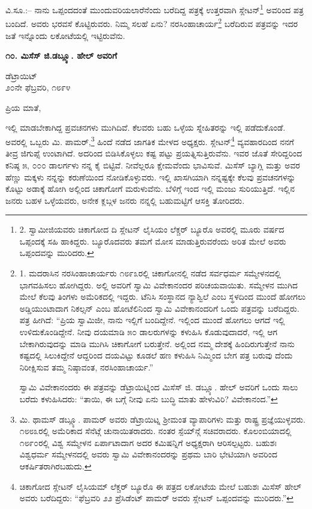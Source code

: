 ವಿ.ಸೂ.:– ನಾನು ಒಪ್ಪಂದದಂತೆ ಮುಂದುವರಿಯಲಾರೆನೆಂದು ಬರೆದಿದ್ದ ಪತ್ರಕ್ಕೆ ಉತ್ತರವಾಗಿ ಸ್ಲೇಟನ್\footnote{2. ಸ್ವಾಮೀಜಿಯವರು ಚಿಕಾಗೋದ ದಿ ಸ್ಲೇಟನ್ ಲೈಸಿಯಂ ಲೆಕ್ಚರ್ ಬ್ಯೂರೊ ಅವರಲ್ಲಿ ಮೂರು ವರ್ಷದ ಒಪ್ಪಂದಕ್ಕೆ ಸಹಿ ಹಾಕಿದ್ದರು. ಬ್ಯೂರೊದವರು ತಮಗೆ ಮೋಸ ಮಾಡುತ್ತಿರುವರೆಂದು ಅರಿತ ಮೇಲೆ ಅವರು ಒಪ್ಪಂದವನ್ನು ಮುರಿದರು.} ಅವರಿಂದ ಪತ್ರ ಬಂದಿದೆ. ಅವರು ಭರವಸೆ ಕೊಟ್ಟಿರುವರು. ನಿಮ್ಮ ಸಲಹೆ ಏನು? ನರಸಿಂಹಾಚಾರ್ಯ\footnote{1. ಮದರಾಸಿನ ನರಸಿಂಹಾಚಾರ್ಯರು ೧೮೯೩ರಲ್ಲಿ ಚಿಕಾಗೋನಲ್ಲಿ ನಡೆದ ಸರ್ವಧರ್ಮ ಸಮ್ಮೇಳನದಲ್ಲಿ ಭಾಗವಹಿಸಲು ಹೋಗಿದ್ದರು. ಅಲ್ಲಿ ಅವರಿಗೆ ಸ್ವಾಮಿ ವಿವೇಕಾನಂದರ ಪರಿಚಯವಾಯಿತು. ಸಮ್ಮೇಳನ ಮುಗಿದ ಮೇಲೆ ಕೆಲವು ತಿಂಗಳು ಅಮೆರಿಕದಲ್ಲಿ ಇದ್ದರು. ಟೆನಿಸಿ ಸಂಸ್ಥಾನದ ನ್ಯಾಶ್ವಿಲೆ ಎಂಬ ಸ್ಥಳದಿಂದ ಮುಂದೆ ಹೋಗಲು ಅಡ್ಡಿಯುಂಟಾದಾಗ ನಿಕಲ್ಸನ್ ಎಂಬ ಹೋಟೆಲಿನಿಂದ ಸ್ವಾಮಿ ವಿವೇಕಾನಂದರಿಗೆ ಒಂದು ಪತ್ರವನ್ನು ಬರೆದಿದ್ದರು. ಪತ್ರ ಹೀಗಿದೆ: “ಪ್ರಿಯ ಸ್ವಾಮಿಜೀ, ನಾನು ಇಲ್ಲಿಗೆ ಬಂದಿದ್ದೇನೆ. ಇಲ್ಲಿಂದ ಮುಂದೆ ಹೋಗಲು ಆಗದೆ ಇಲ್ಲಿ ಉಳಿದುಕೊಂಡಿದ್ದೇನೆ. ನೀವು ದಯಮಾಡಿ ೫೦ ಡಾಲರುಗಳನ್ನು ಕಳುಹಿಸಿ ಕೊಡುವುದಾದರೆ, ಇಲ್ಲಿ ಆಗ ಬೇಕಾಗಿರುವುದನ್ನು ಮಾಡಿ ಮುಗಿಸಿ ಚಿಕಾಗೋಗೆ ಬರುತ್ತೇನೆ. ಅಲ್ಲಿಂದ ನಮ್ಮ ದೇಶಕ್ಕೆ ಹಿಂದಿರುಗುತ್ತೇನೆ ನಾನು ಕಷ್ಟದಲ್ಲಿ ಸಿಲುಕಿದ್ದೇನೆ ಆದ್ದರಿಂದ ದಯವಿಟ್ಟು ಕೂಡಲೆ ಹಣ ಕಳುಹಿಸಿ ನಿಮ್ಮಿಂದ ಬೇಗ ಪತ್ರ ಬರುವು ದೆಂದು ನಿರೀಕ್ಷಿಸುವ ತಮ್ಮ ನಿಷ್ಠಾವಂತ, ನರಸಿಂಹಾಚಾರ್ಯ.”

ಸ್ವಾಮಿ ವಿವೇಕಾನಂದರು ಈ ಪತ್ರವನ್ನು ಡೆಟ್ರಾಯಿಟ್ನಿಂದ ಮಿಸೆಸ್ ಜಿ. ಡಬ್ಲ್ಯೂ. ಹೇಲ್ ಅವರಿಗೆ ಒಂದು ಸಾಲು ಬರೆದು ಕಳುಹಿಸಿದರು: “ತಾಯಿ, ಈ ಬಗ್ಗೆ ನೀವು ಏನು ಬುದ್ಧಿ ಮಾತು ಹೇಳುವಿರಿ? ವಿವೇಕಾನಂದ.”} ಬರೆದಿರುವ ಪತ್ರವನ್ನು ಇದರ ಜತೆ ಇನ್ನೊಂದು ಲಕೋಟೆಯಲ್ಲಿ ಇಟ್ಟಿರುವೆನು.

\begin{center}
\textbf{೧೦. ಮಿಸೆಸ್ ಜಿ.ಡಬ್ಲ್ಯೂ. ಹೇಲ್ ಅವರಿಗೆ}
\end{center}

\begin{flushright}
ಡೆಟ್ರಾಯಿಟ್\\೨೦ನೇ ಫೆಬ್ರವರಿ, ೧೮೯೪
\end{flushright}

ಪ್ರಿಯ ಮಾತೆ,

ಇಲ್ಲಿ ಮಾಡಬೇಕಾಗಿದ್ದ ಪ್ರವಚನಗಳು ಮುಗಿದಿವೆ. ಕೆಲವರು ಬಹು ಒಳ್ಳೆಯ ಸ್ನೇಹಿತರನ್ನು ಇಲ್ಲಿ ಪಡೆದುಕೊಂಡೆ. ಅವರಲ್ಲಿ ಒಬ್ಬರು ಮಿ. ಪಾಮರ್,\footnote{ಮಿ. ಥಾಮಸ್ ಡಬ್ಲ್ಯೂ. ಪಾಮರ್ ಅವರು ಡೆಟ್ರಾಯಿಟ್ನ ಶ‍್ರೀಮಂತ ವ್ಯಾಪಾರಿಗಳು ಮತ್ತು ರಾಷ್ಟ್ರ ಪ್ರಜ್ಞೆಯುಳ್ಳವರು. ೧೮೮೩ರಲ್ಲಿ ಅಮೆರಿಕಾದ ಸೆನೆಟ್ಗೆ ಚುನಾಯಿತರಾದರು. ನಂತರ ಸ್ಪೆಯ್​ನ್ಗೆ ಸಚಿವರಾದರು. ಕೊಲಂಬಿಯಾದಲ್ಲಿ ೧೮೯೦ರಲ್ಲಿ ವಿಶ್ವ ಸಮ್ಮೇಳನ ಏರ್ಪಾಟಾದಾಗ ಅದರ ಕಮಿಷನ್ನಿಗೆ ಅಧ್ಯಕ್ಷರಾಗಿ ಆರಿಸಲ್ಪಟ್ಟರು. ಬಹುಶಃ ವಿಶ್ವಧರ್ಮ ಸಮ್ಮೇಳನದಲ್ಲಿ ಅವರು ಸ್ವಾಮಿ ವಿವೇಕಾನಂದರನ್ನು ಪ್ರಥಮ ಬಾರಿ ಭೇಟಿಯಾಗಿ ಅವರಿಂದ ಆಕರ್ಷಿತರಾಗಿರಬಹುದು.} ಹಿಂದೆ ನಡೆದ ಜಾಗತಿಕ ಮೇಳದ ಅಧ್ಯಕ್ಷರು. ಸ್ಲೇಟನ್\footnote{ಚಿಕಾಗೋದ ಸ್ಲೇಟನ್ ಲೈಸಿಯಮ್​ ಲೆಕ್ಚರ್ ಬ್ಯೂರೊ ಈ ಪತ್ರದ ಲಕೋಟೆಯ ಮೇಲೆ ಬಹುಶಃ ಮಿಸೆಸ್ ಹೇಲ್ ಅವರು ಬರೆದಿದ್ದರು: “ಫೆಬ್ರವರಿ ೨೨ ಪ್ರೆಸಿಡೆಂಟ್ ಪಾಮರ್ ಅವರು ಸ್ಲೇಟನ್ ಒಪ್ಪಂದವನ್ನು ಮುರಿದರು.”} ವ್ಯವಹಾರದಿಂದ ನನಗೆ ತೀವ್ರ ಜಿಗುಪ್ಸೆ ಉಂಟಾಗಿದೆ. ಅದರಿಂದ ಬಿಡಿಸಿಕೊಳ್ಳಲು ಕಷ್ಟ ಪಟ್ಟು ಪ್ರಯತ್ನಿಸುತ್ತಿರುವೆನು. ಇವರ ಜೊತೆ ಸೇರಿದ್ದರಿಂದ ಕನಿಷ್ಠ ೫, ೦೦೦ ಡಾಲರ್ಗಳು ನನ್ನ ಕೈ ಬಿಟ್ಟಿವೆ. ನೀವೆಲ್ಲರೂ ಕ್ಷೇಮವೆಂದು ಭಾವಿಸುವೆ. ಮಿಸೆಸ್ ಬ್ಯಾಗ್ಲಿ ಮತ್ತು ಅವರ ಹೆಣ್ಣು ಮಕ್ಕಳು ನನ್ನನ್ನು ಕರುಣೆಯಿಂದ ನೋಡಿಕೊಳ್ಳುವರು. ಇಲ್ಲಿ ಖಾಸಗಿಯಾಗಿ ನನ್ನಷ್ಟಕ್ಕೇ ಕೆಲವು ಪ್ರವಚನಗಳನ್ನು ಕೊಟ್ಟು ಅಡಾಕ್ಕೆ ಹೋಗಿ ಅಲ್ಲಿಂದ ಚಿಕಾಗೋಗೆ ಮರುಳುವೆನು. ಬೆಳಿಗ್ಗೆ ಇಂದ ಇಲ್ಲಿ ಮಂಜು ಸುರಿಯುತ್ತಿದೆ. ಇಲ್ಲಿನ ಜನರು ಬಹಳ ಒಳ್ಳೆಯವರು, ಅನೇಕ ಕ್ಲಬ್ಗಳ ಜನರು ನನ್ನಲ್ಲಿ ಬಹುಮಟ್ಟಿಗೆ ಆಸಕ್ತಿ ತೋರಿದರು.

